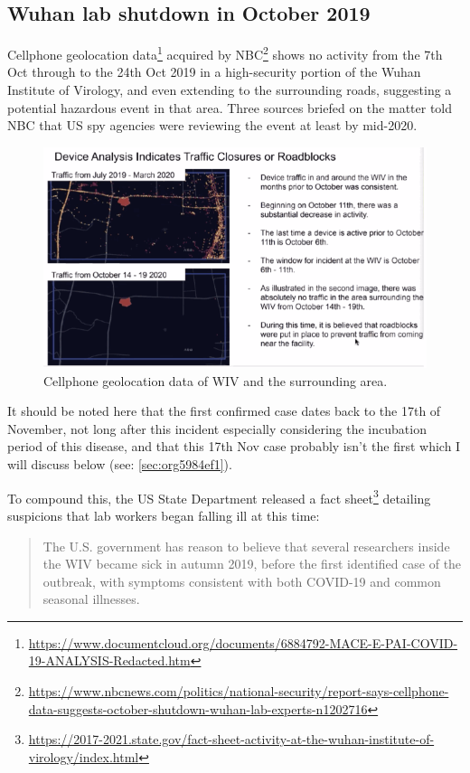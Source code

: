 \documentclass[11pt]{article}
\begin{document}
\subsection{Wuhan lab shutdown in October 2019}
\label{sec:org2199d83}
Cellphone geolocation data\footnote{\url{https://www.documentcloud.org/documents/6884792-MACE-E-PAI-COVID-19-ANALYSIS-Redacted.htm}} acquired by NBC\footnote{\url{https://www.nbcnews.com/politics/national-security/report-says-cellphone-data-suggests-october-shutdown-wuhan-lab-experts-n1202716}} shows no activity from the 7th Oct through to the 24th Oct 2019 in a high-security portion of the Wuhan Institute of Virology, and even extending to the surrounding roads, suggesting a potential hazardous event in that area. Three sources briefed on the matter told NBC that US spy agencies were reviewing the event at least by mid-2020.

\begin{figure}[htbp]
\centering
\includegraphics[width=.9\linewidth]{./images/lab-shutdown.png}
\caption{Cellphone geolocation data of WIV and the surrounding area.}
\end{figure}

It should be noted here that the first confirmed case dates back to the 17th of November, not long after this incident especially considering the incubation period of this disease, and that this 17th Nov case probably isn't the first which I will discuss below (see: \ref{sec:org5984ef1}).

To compound this, the US State Department released a fact sheet\footnote{\url{https://2017-2021.state.gov/fact-sheet-activity-at-the-wuhan-institute-of-virology/index.html}} detailing suspicions that lab workers began falling ill at this time:
\begin{quote}
The U.S. government has reason to believe that several researchers inside the WIV became sick in autumn 2019, before the first identified case of the outbreak, with symptoms consistent with both COVID-19 and common seasonal illnesses.
\end{quote}
\end{document}
